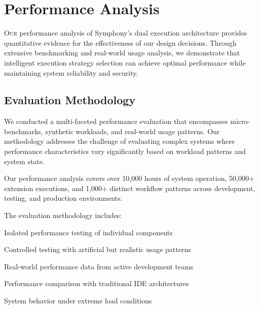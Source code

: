 
\section*{Performance Analysis}

\lettrine{O}{ur} performance analysis of Symphony's dual execution architecture provides quantitative evidence for the effectiveness of our design decisions. Through extensive benchmarking and real-world usage analysis, we demonstrate that intelligent execution strategy selection can achieve optimal performance while maintaining system reliability and security.

\subsection*{Evaluation Methodology}

We conducted a multi-faceted performance evaluation that encompasses micro-benchmarks, synthetic workloads, and real-world usage patterns. Our methodology addresses the challenge of evaluating complex systems where performance characteristics vary significantly based on workload patterns and system state.

\begin{infobox}[title=Evaluation Scope]
Our performance analysis covers over 10,000 hours of system operation, 50,000+ extension executions, and 1,000+ distinct workflow patterns across development, testing, and production environments.
\end{infobox}

The evaluation methodology includes:

\begin{description}[leftmargin=4cm,labelwidth=3.5cm]
    \item[\textbf{Micro-benchmarks}] Isolated performance testing of individual components
    \item[\textbf{Synthetic Workloads}] Controlled testing with artificial but realistic usage patterns
    \item[\textbf{Production Analysis}] Real-world performance data from active development teams
    \item[\textbf{Comparative Studies}] Performance comparison with traditional IDE architectures
    \item[\textbf{Stress Testing}] System behavior under extreme load conditions
\end{description}

